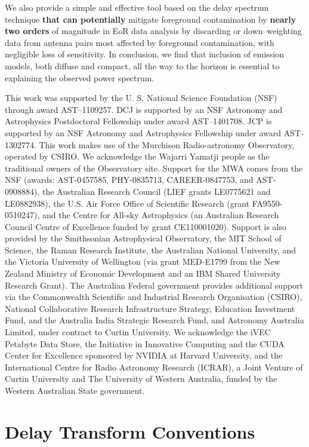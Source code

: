 \documentclass[preprint2,iop,numberedappendix,twocolappendix,appendixfloats]{emulateapj}
\begin{document}
We also provide a simple and effective tool based on the delay spectrum technique {\bf that can potentially} mitigate foreground contamination by {\bf nearly two orders} of magnitude in EoR data analysis by discarding or down--weighting data from antenna pairs most affected by foreground contamination, with negligible loss of sensitivity. In conclusion, we find that inclusion of emission models, both diffuse and compact, all the way to the horizon is essential to explaining the observed power spectrum. 

\acknowledgments

This work was supported by the U. S. National Science Foundation (NSF) through award AST--1109257. DCJ is supported by an NSF Astronomy and Astrophysics Postdoctoral Fellowship under award AST--1401708. JCP is supported by an NSF Astronomy and Astrophysics Fellowship under award AST-1302774. This work makes use of the Murchison Radio-astronomy Observatory, operated by CSIRO. We acknowledge the Wajarri Yamatji people as the traditional owners of the Observatory site. Support for the MWA comes from the NSF (awards: AST-0457585, PHY-0835713, CAREER-0847753, and AST-0908884), the Australian Research Council (LIEF grants LE0775621 and LE0882938), the U.S. Air Force Office of Scientific Research (grant FA9550-0510247), and the Centre for All-sky Astrophysics (an Australian Research Council Centre of Excellence funded by grant CE110001020). Support is also provided by the Smithsonian Astrophysical Observatory, the MIT School of Science, the Raman Research Institute, the Australian National University, and the Victoria University of Wellington (via grant MED-E1799 from the New Zealand Ministry of Economic Development and an IBM Shared University Research Grant). The Australian Federal government provides additional support via the Commonwealth Scientific and Industrial Research Organisation (CSIRO), National Collaborative Research Infrastructure Strategy, Education Investment Fund, and the Australia India Strategic Research Fund, and Astronomy Australia Limited, under contract to Curtin University. We acknowledge the iVEC Petabyte Data Store, the Initiative in Innovative Computing and the CUDA Center for Excellence sponsored by NVIDIA at Harvard University, and the International Centre for Radio Astronomy Research (ICRAR), a Joint Venture of Curtin University and The University of Western Australia, funded by the Western Australian State government.  

\appendix

\section{Delay Transform Conventions}\label{sec:delay-conventions}
\end{document}

